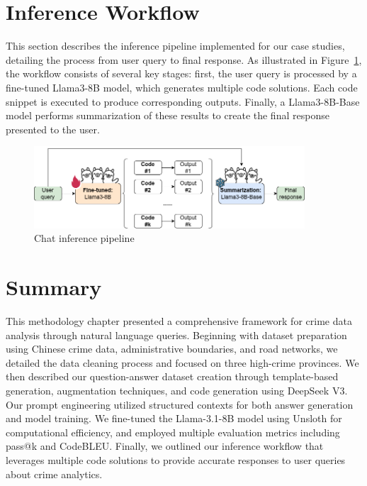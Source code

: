 

\section{Inference Workflow}

This section describes the inference pipeline implemented for our case studies, detailing the process from user query to final response. As illustrated in Figure~\ref{fig:inference_pipeline}, the workflow consists of several key stages: first, the user query is processed by a fine-tuned Llama3-8B model, which generates multiple code solutions. Each code snippet is executed to produce corresponding outputs. Finally, a Llama3-8B-Base model performs summarization of these results to create the final response presented to the user.

\begin{figure}[H]
  \centering
  \includegraphics[width=0.9\textwidth]{images/inference_pipeline.drawio.png}
  \caption{Chat inference pipeline}
  \label{fig:inference_pipeline}
\end{figure}

\section{Summary}

This methodology chapter presented a comprehensive framework for crime data analysis through natural language queries. Beginning with dataset preparation using Chinese crime data, administrative boundaries, and road networks, we detailed the data cleaning process and focused on three high-crime provinces. We then described our question-answer dataset creation through template-based generation, augmentation techniques, and code generation using DeepSeek V3. Our prompt engineering utilized structured contexts for both answer generation and model training. We fine-tuned the Llama-3.1-8B model using Unsloth for computational efficiency, and employed multiple evaluation metrics including pass@k and CodeBLEU. Finally, we outlined our inference workflow that leverages multiple code solutions to provide accurate responses to user queries about crime analytics.
